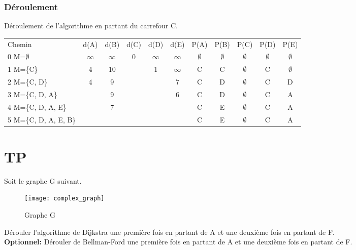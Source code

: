 \documentclass[11pt]{extarticle}
\begin{document}
\subsubsection{Déroulement}
Déroulement de l'algorithme en partant du carrefour C.\\
\begin{center}
\begin{tabular*}{0.95\textwidth}{|l|c|c|c|c|c||c|c|c|c|c|}
 \rowcolor{light_green} Chemin & d(A) & d(B) & d(C) & d(D) & d(E) & P(A)& P(B)& P(C)& P(D)& P(E) \\
  \rowcolor{light_green2} 0 M=$\emptyset$ & $\infty$ & $\infty$ & 0 & $\infty$ & $\infty$ & $\emptyset$ & $\emptyset$ & $\emptyset$ & $\emptyset$ & $\emptyset$ \\
   \rowcolor{light_green2} 1 M=\{C\} & 4 & 10 &  & \cellcolor{yellow} 1 & $\infty$ & C & C & $\emptyset$ & C & $\emptyset$ \\
\rowcolor{light_green2} 2 M=\{C, D\} & \cellcolor{yellow} 4 & 9 &  &  & 7 & C & D & $\emptyset$ & C & D \\
\rowcolor{light_green2} 3 M=\{C, D, A\} & & 9 & & & \cellcolor{yellow} 6 & C & D & $\emptyset$ & C & A \\
 \rowcolor{light_green2} 4 M=\{C, D, A, E\} &  & \cellcolor{yellow} 7 &  &  &  & C & E & $\emptyset$ & C & A \\
 \rowcolor{light_green2} 5 M=\{C, D, A, E, B\} &  &  &  &  &  & C & E & $\emptyset$ & C & A \\
 \end{tabular*}
\end{center}
\section{TP}
\noindent
Soit le graphe G suivant.\\
\begin{figure}[H]
\begin{center}
\texttt{[image: complex\_graph]}
\caption{Graphe G}
\end{center}
\end{figure}
Dérouler l'algorithme de Dijkstra une première fois en partant de A et une deuxième fois en partant de F. \\
\textbf{Optionnel:} Dérouler  de Bellman-Ford une première fois en partant de A et une deuxième fois en partant de F.
\end{document}
